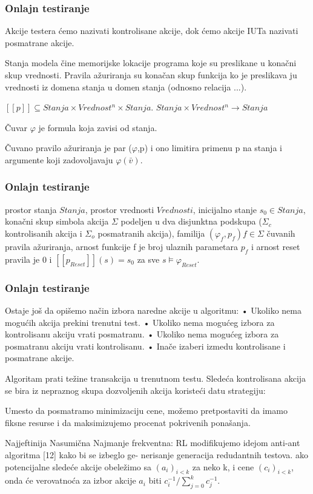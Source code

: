 \documentclass[11pt]{beamer}
\theoremstyle{definition}
\begin{document}
{\begin{frame}
\frametitle{Onlajn testiranje}
Akcije testera ćemo nazivati kontrolisane akcije, dok ćemo akcije IUTa nazivati posmatrane akcije.

Stanja modela čine memorijske lokacije programa koje su preslikane u konačni skup vrednosti.
Pravila ažuriranja su konačan skup funkcija ko je preslikava ju vrednosti iz domena stanja u domen stanja (odnosno relacija ...).

$[[p]] \subseteq Stanja \times Vrednost^n \times Stanja$.
$Stanja \times Vrednost^n  \rightarrow Stanja$

Čuvar $\varphi$ je formula koja zavisi od stanja.

Čuvano pravilo ažuriranja je par ($\varphi$,p) i ono limitira primenu p na stanja i argumente koji zadovoljavaju $\varphi(\bar{v})$.
\end{frame}


\begin{frame}
\frametitle{Onlajn testiranje}

prostor stanja $Stanja$,
prostor vrednosti $Vrednosti$,
inicijalno stanje $s_0 \in Stanja$,
konačni skup simbola akcija $\Sigma$ podeljen u dva disjunktna podskupa ($\Sigma_c$ kontrolisanih akcija i $\Sigma_o$ posmatranih akcija),
familija $(\varphi_f, p_f) f \in \Sigma$ čuvanih pravila ažuriranja,
arnost funkcije f je broj ulaznih parametara $p_f$ i
arnost reset pravila je 0 i $[[p_{Reset}]](s) = s_0$ za sve $s \models \varphi_{Reset}$.

\end{frame}



\begin{frame}
\frametitle{Onlajn testiranje}

Ostaje još da opišemo način izbora naredne akcije u algoritmu:
• Ukoliko nema mogućih akcija prekini trenutni test.
• Ukoliko nema mogućeg izbora za kontrolisanu akciju vrati posmatranu.
• Ukoliko nema mogućeg izbora za posmatranu akciju vrati kontrolisanu.
• Inače
izaberi izmedu kontrolisane i posmatrane akcije.

Algoritam prati težine transakcija u trenutnom testu. Sledeća kontrolisana akcija se bira iz nepraznog skupa dozvoljenih akcija koristeći datu strategiju:

Umesto da posmatramo minimizaciju cene, možemo pretpostaviti da imamo fiksne resurse i da maksimizujemo procenat pokrivenih ponašanja.

Najjeftinija
Nasumična
Najmanje frekventna:
RL modifikujemo idejom anti-ant algoritma [12] kako bi se izbeglo ge- nerisanje generacija redudantnih testova.
ako potencijalne sledeće akcije obeležimo sa $(a_i)_{i < k}$ za neko k, i cene $(c_i)_{i < k}$, onda će verovatnoća za izbor akcije $a_i$ biti $c_i^{-1} / \sum_{j=0}^{k} c_j^{-1}$.


\end{frame}}
\end{document}
